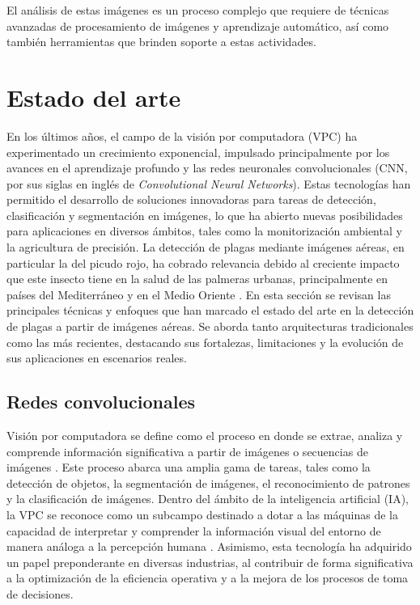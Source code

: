 
El análisis de estas imágenes es un proceso complejo que requiere de técnicas avanzadas de procesamiento de imágenes y aprendizaje automático, así como también herramientas que brinden soporte a estas actividades.

\section{Estado del arte}
\label{sec:estadoArte}

En los últimos años, el campo de la visión por computadora (VPC) ha experimentado un crecimiento exponencial, impulsado principalmente por los avances en el aprendizaje profundo y las redes neuronales convolucionales (CNN, por sus siglas en inglés de \textit{Convolutional Neural Networks}). Estas tecnologías han permitido el desarrollo de soluciones innovadoras para tareas de detección, clasificación y segmentación en imágenes, lo que ha abierto nuevas posibilidades para aplicaciones en diversos ámbitos, tales como la monitorización ambiental y la agricultura de precisión. La detección de plagas mediante imágenes aéreas, en particular la del picudo rojo, ha cobrado relevancia debido al creciente impacto que este insecto tiene en la salud de las palmeras urbanas, principalmente en países del Mediterráneo y en el Medio Oriente \citep{poplin_palm_2014}.
En esta sección se revisan las principales técnicas y enfoques que han marcado el estado del arte en la detección de plagas a partir de imágenes aéreas. Se aborda tanto arquitecturas tradicionales como las más recientes, destacando sus fortalezas, limitaciones y la evolución de sus aplicaciones en escenarios reales.

\subsection{Redes convolucionales}
\label{sec:redesConvolucionales}

Visión por computadora se define como el proceso en donde se extrae, analiza y comprende información significativa a partir de imágenes o secuencias de imágenes \citep{bmva_what_2017}. Este proceso abarca una amplia gama de tareas, tales como la detección de objetos, la segmentación de imágenes, el reconocimiento de patrones y la clasificación de imágenes. Dentro del ámbito de la inteligencia artificial (IA), la VPC se reconoce como un subcampo destinado a dotar a las máquinas de la capacidad de interpretar y comprender la información visual del entorno de manera análoga a la percepción humana \citep{torralba_foundations_2024}. Asimismo, esta tecnología ha adquirido un papel preponderante en diversas industrias, al contribuir de forma significativa a la optimización de la eficiencia operativa y a la mejora de los procesos de toma de decisiones.

